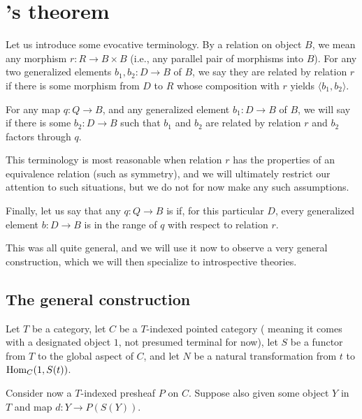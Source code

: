\section{\Loeb's theorem}


Let us introduce some evocative terminology. By a relation on object $B$, we mean any morphism $r : R \to B \times B$ (i.e., any parallel pair of morphisms into $B$). For any two generalized elements $b_1, b_2 : D \to B$ of $B$, we say they are related by relation $r$ if there is some morphism from $D$ to $R$ whose composition with $r$ yields $\langle b_1, b_2 \rangle$.

For any map $q: Q \to B$, and any generalized element $b_1 : D \to B$ of $B$, we will say  if there is some $b_2 : D \to B$ such that $b_1$ and $b_2$ are related by relation $r$ and $b_2$ factors through $q$.

This terminology is most reasonable when relation $r$ has the properties of an equivalence relation (such as symmetry), and we will ultimately restrict our attention to such situations, but we do not for now make any such assumptions.

Finally, let us say that any $q : Q \to B$ is  if, for this particular $D$, every generalized element $b : D \to B$ is in the range of $q$ with respect to relation $r$.

This was all quite general, and we will use it now to observe a very general construction, which we will then specialize to introspective theories.

\subsection{The general construction}
\begin{construction}\label{GeneralDiag}
\end{construction}
Let $T$ be a category, let $C$ be a $T$-indexed pointed category ( meaning it comes with a designated object $1$, not presumed terminal for now), let $S$ be a functor from $T$ to the global aspect of $C$, and let $N$ be a natural transformation from $t$ to $\operatorname{Hom}_C(1, S(t))$.

Consider now a $T$-indexed presheaf $P$ on $C$. Suppose also given some object $Y$ in $T$ and map $d : Y \to P(S(Y))$.

